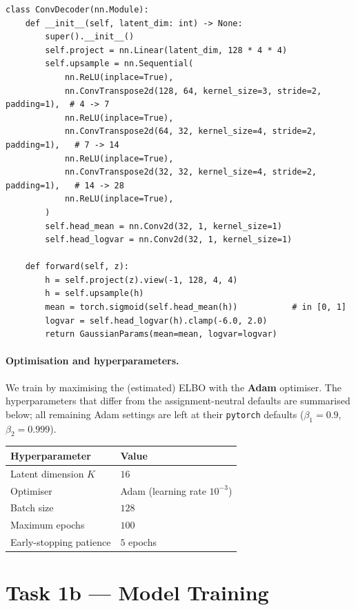 \documentclass{article}
\begin{document}
\begin{lstlisting}[caption={Transposed-convolutional decoder (\texttt{vae/model.py}).}]
class ConvDecoder(nn.Module):
    def __init__(self, latent_dim: int) -> None:
        super().__init__()
        self.project = nn.Linear(latent_dim, 128 * 4 * 4)
        self.upsample = nn.Sequential(
            nn.ReLU(inplace=True),
            nn.ConvTranspose2d(128, 64, kernel_size=3, stride=2, padding=1),  # 4 -> 7
            nn.ReLU(inplace=True),
            nn.ConvTranspose2d(64, 32, kernel_size=4, stride=2, padding=1),   # 7 -> 14
            nn.ReLU(inplace=True),
            nn.ConvTranspose2d(32, 32, kernel_size=4, stride=2, padding=1),   # 14 -> 28
            nn.ReLU(inplace=True),
        )
        self.head_mean = nn.Conv2d(32, 1, kernel_size=1)
        self.head_logvar = nn.Conv2d(32, 1, kernel_size=1)

    def forward(self, z):
        h = self.project(z).view(-1, 128, 4, 4)
        h = self.upsample(h)
        mean = torch.sigmoid(self.head_mean(h))           # in [0, 1]
        logvar = self.head_logvar(h).clamp(-6.0, 2.0)
        return GaussianParams(mean=mean, logvar=logvar)
\end{lstlisting}

\paragraph{Optimisation and hyperparameters.} We train by maximising the
(estimated) ELBO with the \textbf{Adam} optimiser. The hyperparameters that
differ from the assignment-neutral defaults are summarised below; all remaining
Adam settings are left at their \texttt{pytorch} defaults
($\beta_1=0.9$, $\beta_2=0.999$).

\begin{center}
\begin{tabular}{ll}
\hline
Hyperparameter & Value \\
\hline
Latent dimension $K$ & $16$ \\
Optimiser & Adam (learning rate $10^{-3}$) \\
Batch size & $128$ \\
Maximum epochs & $100$ \\
Early-stopping patience & $5$ epochs \\
\hline
\end{tabular}
\end{center}

\section*{Task 1b --- Model Training}
\end{document}

